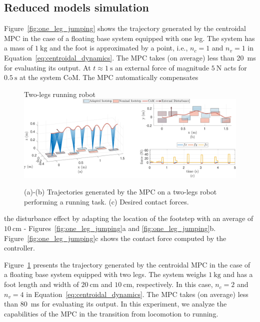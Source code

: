 \subsection{Reduced models simulation}
Figure~\ref{fig:one_leg_jumping} shows the trajectory generated by the centroidal MPC in the case of a floating base system equipped with one leg. The system has a mass of $\SI{1}{\kilo \gram}$ and the foot is approximated by a point, i.e., $n_c = 1$ and $n_v=1$ in Equation~\eqref{eq:centroidal_dynamics}. 
The MPC takes (on average) less than \SI{20}{\milli \second} for evaluating its output. At $t \approx \SI{1}{\second}$ an external force of magnitude $\SI{5}{\newton}$ acts for $\SI{0.5}{\second}$ at the system CoM.
The MPC automatically compensates 
\begin{figure}[!t]
    \centering
    \begin{myframe}{Two-legs running robot}
    \includegraphics[width=\textwidth]{chapter_centroidal_mpc/figures/running_traj.pdf}
    \end{myframe}
    \caption{(a)-(b) Trajectories generated by the MPC on a two-legs robot performing a running task. (c) Desired contact forces.}
    \label{fig:running_traj}
\end{figure}
the disturbance effect by adapting the location of the footstep with an average of $\SI{10}{\centi \meter}$ - Figures~\ref{fig:one_leg_jumping}a and \ref{fig:one_leg_jumping}b.
Figure~\ref{fig:one_leg_jumping}c shows the contact force computed by the controller.
\par
Figure~\ref{fig:running_traj} presents the trajectory generated by the centroidal MPC in the case of a floating base system equipped with two legs. The system weighs $\SI{1}{\kilo \gram}$ and has a foot length and width of $\SI{20}{\centi \meter}$ and $\SI{10}{\centi \meter}$, respectively. In this case, $n_c = 2$ and $n_v=4$ in Equation~\eqref{eq:centroidal_dynamics}. The MPC takes (on average) less than \SI{80}{\milli \second} for evaluating its output. 
In this experiment, we analyze the capabilities of the MPC in the transition from locomotion to running. 
